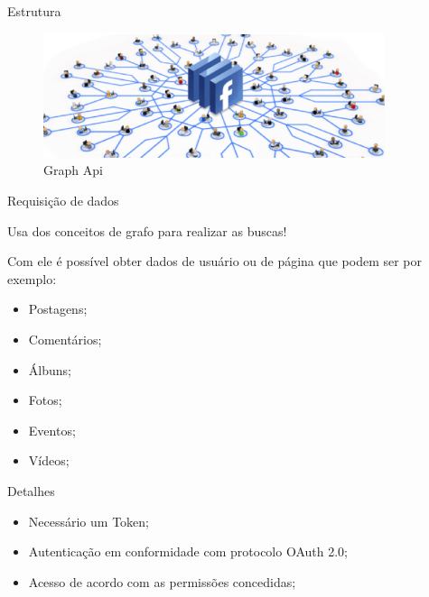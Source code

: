 \documentclass{aula-ifb}
\begin{document}
\begin{frame}{Estrutura}
	\begin{figure}[h]
		\includegraphics[width=10cm]{figuras/facebookgraph.png}
		\caption{Graph Api}
		\label{fig:facebookgraph}
	\end{figure}
\end{frame}

\begin{frame}{Requisição de dados}
\begin{center}
Usa dos conceitos de grafo para realizar as buscas!\\
\end{center}
Com ele é possível obter dados de usuário ou de página que podem ser por exemplo: 
\begin{itemize}
   \item Postagens;
   \item Comentários;
   \item Álbuns;
   \item Fotos;
   \item Eventos;
   \item Vídeos;
\end{itemize}
\end{frame}

\begin{frame}{Detalhes}
\begin{itemize}
   \item Necessário um Token;
   \item Autenticação em conformidade com protocolo OAuth 2.0;
   \item Acesso de acordo com as permissões concedidas;
\end{itemize}
\end{frame}
\end{document}
